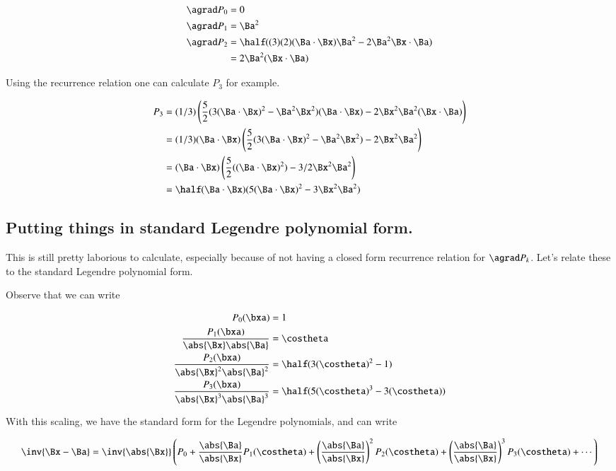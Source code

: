 \begin{align*}
\agrad P_0 &= 0 \\
\agrad P_1 &= \Ba^2 \\
\agrad P_2 &= \half((3)(2)(\Ba \cdot \Bx)\Ba^2 - 2\Ba^2\Bx \cdot \Ba) \\
           &= 2\Ba^2(\Bx \cdot \Ba) \\
\end{align*}

Using the recurrence relation one can calculate $P_3$ for example.

\begin{align*}
P_3
&=
(1/3)\left(
\frac{5}{2}(3(\Ba \cdot \Bx)^2 -\Ba^2\Bx^2)({\Ba \cdot \Bx})
- 2 \Bx^2 \Ba^2(\Bx \cdot \Ba) \right) \\
&=
(1/3) ({\Ba \cdot \Bx}) \left(
\frac{5}{2}(3(\Ba \cdot \Bx)^2 -\Ba^2\Bx^2)
- 2 \Bx^2 \Ba^2 \right) \\
&=
({\Ba \cdot \Bx}) \left( \frac{5}{2}((\Ba \cdot \Bx)^2 ) - 3/2 \Bx^2 \Ba^2 \right) \\
&=
\half({\Ba \cdot \Bx}) ( {5}(\Ba \cdot \Bx)^2 - 3 \Bx^2 \Ba^2 ) \\
\end{align*}

\subsection{ Putting things in standard Legendre polynomial form.}

This is still pretty laborious to calculate, especially because of not having a closed form recurrence
relation for $\agrad P_k$.  Let's relate these to the standard Legendre polynomial form.

Observe that we can write

\begin{align*}
P_0(\bxa) &= 1 \\
\frac{P_1(\bxa)}{\abs{\Bx} \abs{\Ba}} &= \costheta \\
\frac{P_2(\bxa)}{\abs{\Bx}^2 \abs{\Ba}^2} &= \half(3(\costheta)^2 - 1) \\
\frac{P_3(\bxa)}{\abs{\Bx}^3 \abs{\Ba}^3} &= \half ( {5}(\costheta)^3 - 3 {(\costheta)} ) \\
\end{align*}

With this scaling, we have the standard form for the Legendre polynomials, and can write

\[
\inv{\Bx-\Ba} = \inv{\abs{\Bx}}\left(
P_0 
+ \frac{\abs{\Ba}}{\abs{\Bx}} P_1(\costheta)
+ \left(\frac{\abs{\Ba}}{\abs{\Bx}}\right)^2 P_2(\costheta)
+ \left(\frac{\abs{\Ba}}{\abs{\Bx}}\right)^3 P_3(\costheta)
+ \cdots \right)
\]

